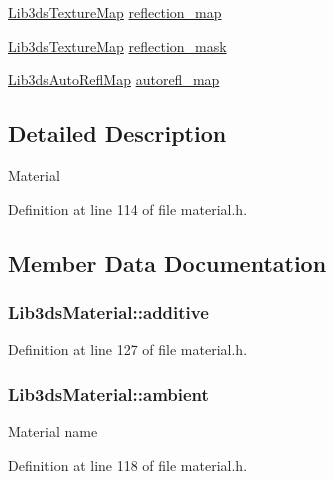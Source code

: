 \begin{DoxyCompactItemize}
\item 
\hyperlink{struct_lib3ds_texture_map}{Lib3ds\-Texture\-Map} \hyperlink{struct_lib3ds_material_a8fb5663dc8d7b194b4cb3fcd99af3a42}{reflection\-\_\-map}
\item 
\hyperlink{struct_lib3ds_texture_map}{Lib3ds\-Texture\-Map} \hyperlink{struct_lib3ds_material_a2f50d8db8477d32af852aa1e59a8e269}{reflection\-\_\-mask}
\item 
\hyperlink{struct_lib3ds_auto_refl_map}{Lib3ds\-Auto\-Refl\-Map} \hyperlink{struct_lib3ds_material_a8790d7d2e641b3140a7c7b2e5c325f8c}{autorefl\-\_\-map}
\end{DoxyCompactItemize}


\subsection{Detailed Description}
Material 

Definition at line 114 of file material.\-h.



\subsection{Member Data Documentation}
\hypertarget{struct_lib3ds_material_a8a46fd9393bb6989ac31dd006c5ffa66}{
\subsubsection[{additive}]{ Lib3ds\-Material\-::additive}}\label{struct_lib3ds_material_a8a46fd9393bb6989ac31dd006c5ffa66}


Definition at line 127 of file material.\-h.

\hypertarget{struct_lib3ds_material_a72517b7792273904404d598ef6b9c07d}{
\subsubsection[{ambient}]{ Lib3ds\-Material\-::ambient}}\label{struct_lib3ds_material_a72517b7792273904404d598ef6b9c07d}
Material name 

Definition at line 118 of file material.\-h.

